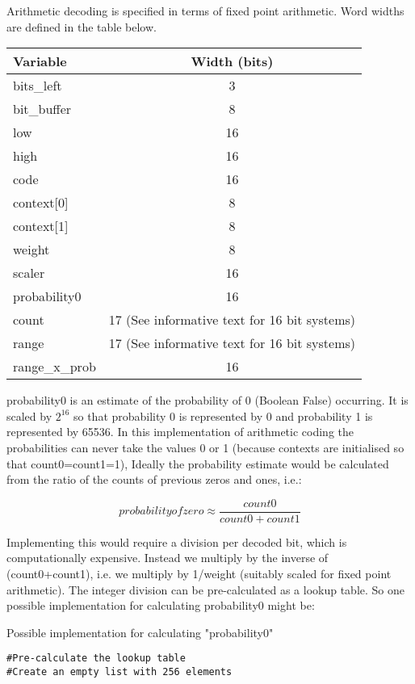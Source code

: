 

\begin{informative}

Arithmetic decoding is specified in terms of fixed point arithmetic.
Word widths are defined in the table below.

\begin{tabular}{l|c}
Variable & Width (bits)\\
\hline
bits\_left & 3\\
bit\_buffer & 8\\
low & 16\\
high & 16\\
code & 16\\
context[0] & 8\\
context[1] & 8\\
weight & 8\\
scaler & 16\\
probability0 & 16\\
count & 17 (See informative text for 16 bit systems)\\
range & 17 (See informative text for 16 bit systems)\\
range\_x\_prob & 16
\end{tabular}

probability0 is an estimate of the probability of 0 (Boolean False)
occurring. It is scaled by $2^{16}$ so that probability 0 is represented by
0 and probability 1 is represented by 65536.  In this implementation of
arithmetic coding the probabilities can never take the values 0 or 1
(because contexts are initialised so that count0=count1=1), Ideally the
probability estimate would be calculated from the ratio of the counts of
previous zeros and ones, i.e.:

\begin{displaymath}
probability of zero \approx \frac{count0}{count0 + count1}
\end{displaymath}

Implementing this would require a division per decoded bit, which is
computationally expensive. Instead we multiply by the inverse of
(count0+count1), i.e. we multiply by 1/weight (suitably scaled for fixed
point arithmetic). The integer division can be pre-calculated as a
lookup table. So one possible implementation for calculating
probability0 might be:


Possible implementation for calculating "probability0"
\begin{verbatim}
#Pre-calculate the lookup table
#Create an empty list with 256 elements


\end{verbatim}
\end{informative}

